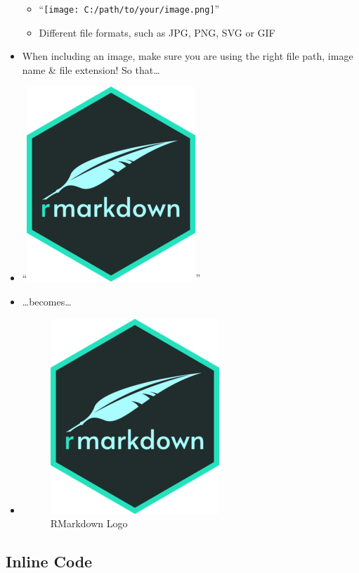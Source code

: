\documentclass[
]{book}
\providecommand{\tightlist}{%
  \setlength{\itemsep}{0pt}\setlength{\parskip}{0pt}}
\begin{document}
\begin{itemize}
  \begin{itemize}
  \tightlist
  \item
    ``\texttt{[image: C:/path/to/your/image.png]}''
  \item
    Different file formats, such as JPG, PNG, SVG or GIF
  \end{itemize}
\item
  When including an image, make sure you are using the right file path, image name \& file extension! So that\ldots{}
\item
  ``\includegraphics{"./img/rmd.png"}''
\item
  \ldots becomes\ldots{}
\item
  \begin{figure}
  \centering
  \includegraphics{./img/rmd.png}
  \caption{RMarkdown Logo}
  \end{figure}
\end{itemize}

\subsection{Inline Code}\label{inline-code}
\end{document}
